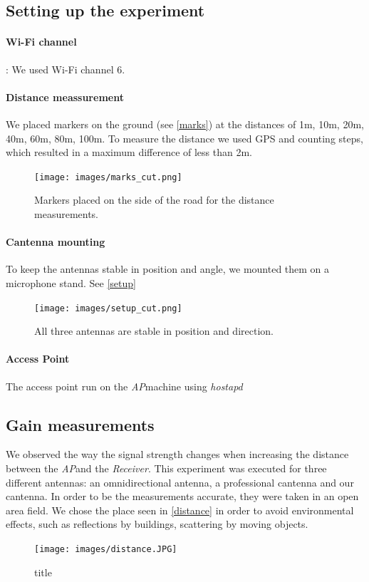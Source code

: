 \documentclass[12pt,a4paper]{article}
\newcommand{\rc}[0]{\emph{Receiver}}
\newcommand{\ap}[0]{\emph{AP}}
\begin{document}
	\subsection{Setting up the experiment}
		\paragraph{Wi-Fi channel}: We used Wi-Fi channel $6$.
		\paragraph{Distance meassurement} We placed markers on the ground (see \autoref{marks}) at the distances of 1m, 10m, 20m, 40m, 60m, 80m, 100m. To measure the distance we used GPS and counting steps, which resulted in a maximum difference of less than 2m.
		\begin{figure}
			\texttt{[image: images/marks\_cut.png]}
			\caption{Markers placed on the side of the road for the distance measurements.}
			\label{marks}
		\end{figure}
		\paragraph{Cantenna mounting} To keep the antennas stable in position and angle, we mounted them on a microphone stand. See \autoref{setup}
		\begin{figure}
			\begin{centering}
				\texttt{[image: images/setup\_cut.png]}
				\caption{All three antennas are stable in position and direction.}
				\label{setup}
			\end{centering}
		\end{figure}
		\paragraph{Access Point} The access point run on the \ap machine using \emph{hostapd}
	
		\subsection{Gain measurements}
			We observed the way the signal strength changes when increasing the distance between the \ap and the \rc. This experiment was executed for three different antennas: an omnidirectional antenna, a professional cantenna and our cantenna.
			In order to be the measurements accurate, they were taken in an open area field. We chose the place seen in \autoref{distance} in order to avoid environmental effects, such as reflections by buildings, scattering by moving objects.
			\begin{figure}
				\texttt{[image: images/distance.JPG]}
				\caption{title}
				\label{distance}
			\end{figure}
		
\end{document}
